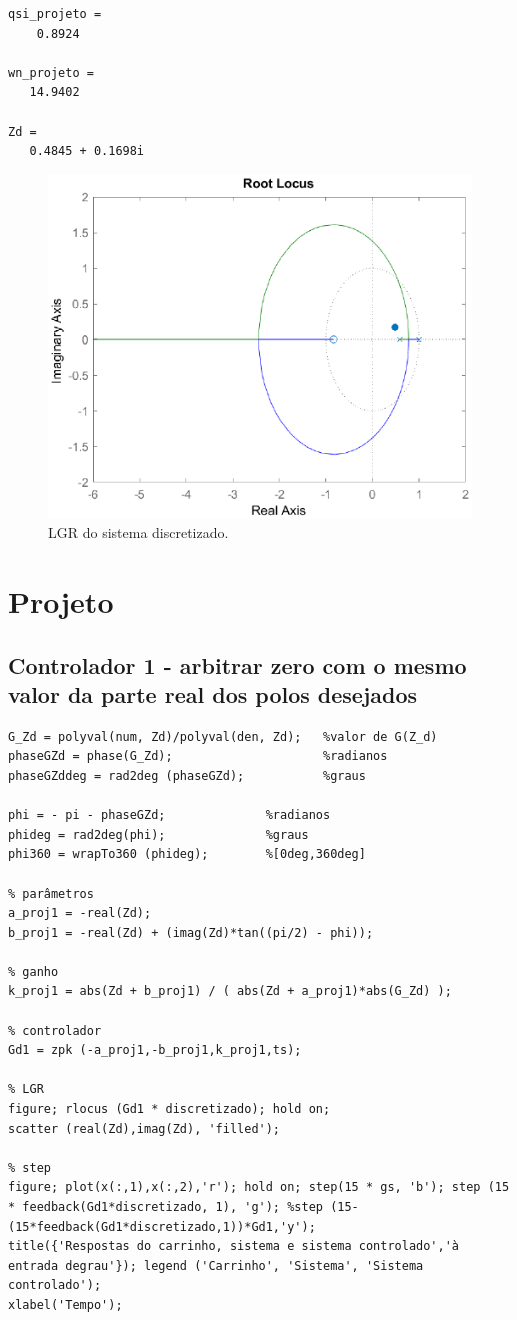 \documentclass{article}
\begin{document}
\color{gray} \begin{verbatim}
qsi_projeto =
    0.8924

wn_projeto =
   14.9402

Zd =
   0.4845 + 0.1698i
\end{verbatim} \color{black}

\begin{figure}[H]
    \centering
        \includegraphics[width=.8\linewidth]{images/Matlab/identifica_02.eps}
        \caption{LGR do sistema discretizado.}\label{fig:lgr_discreto}
\end{figure}


\section{Projeto}

\subsection*{Controlador 1 - arbitrar zero com o mesmo valor da parte real dos polos desejados}

\begin{lstlisting}
G_Zd = polyval(num, Zd)/polyval(den, Zd);   %valor de G(Z_d)
phaseGZd = phase(G_Zd);                     %radianos
phaseGZddeg = rad2deg (phaseGZd);           %graus

phi = - pi - phaseGZd;              %radianos
phideg = rad2deg(phi);              %graus
phi360 = wrapTo360 (phideg);        %[0deg,360deg]

% parâmetros
a_proj1 = -real(Zd);
b_proj1 = -real(Zd) + (imag(Zd)*tan((pi/2) - phi));

% ganho
k_proj1 = abs(Zd + b_proj1) / ( abs(Zd + a_proj1)*abs(G_Zd) );

% controlador
Gd1 = zpk (-a_proj1,-b_proj1,k_proj1,ts);

% LGR
figure; rlocus (Gd1 * discretizado); hold on;
scatter (real(Zd),imag(Zd), 'filled');

% step
figure; plot(x(:,1),x(:,2),'r'); hold on; step(15 * gs, 'b'); step (15 * feedback(Gd1*discretizado, 1), 'g'); %step (15-(15*feedback(Gd1*discretizado,1))*Gd1,'y');
title({'Respostas do carrinho, sistema e sistema controlado','à entrada degrau'}); legend ('Carrinho', 'Sistema', 'Sistema controlado');
xlabel('Tempo');
\end{lstlisting}
\end{document}
